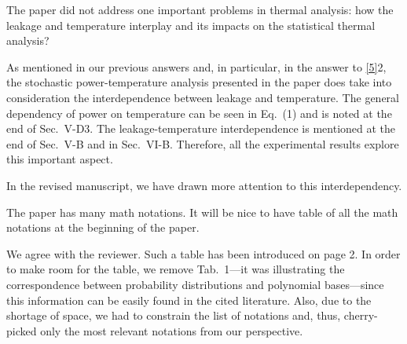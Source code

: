 \begin{reviewer}
The paper did not address one important problems in thermal analysis: how the leakage and temperature interplay and its impacts on the statistical thermal analysis?
\end{reviewer}
\begin{authors}
As mentioned in our previous answers and, in particular, in the answer to \cref{5}{2}, the stochastic power-temperature analysis presented in the paper does take into consideration the interdependence between leakage and temperature.
The general dependency of power on temperature can be seen in Eq.~(1) and is noted at the end of Sec.~V-D3.
The leakage-temperature interdependence is mentioned at the end of Sec.~V-B and in Sec.~VI-B.
Therefore, all the experimental results explore this important aspect.

In the revised manuscript, we have drawn more attention to this interdependency.

\begin{actions}
\end{actions}
\end{authors}

\begin{reviewer}
The paper has many math notations. It will be nice to have table of all the math notations at the beginning of  the paper.
\end{reviewer}
\begin{authors}
We agree with the reviewer.
Such a table has been introduced on page 2.
In order to make room for the table, we remove Tab.~1---it was illustrating the correspondence between probability distributions and polynomial bases---since this information can be easily found in the cited literature.
Also, due to the shortage of space, we had to constrain the list of notations and, thus, cherry-picked only the most relevant notations from our perspective.

\begin{actions}
\end{actions}
\end{authors}

